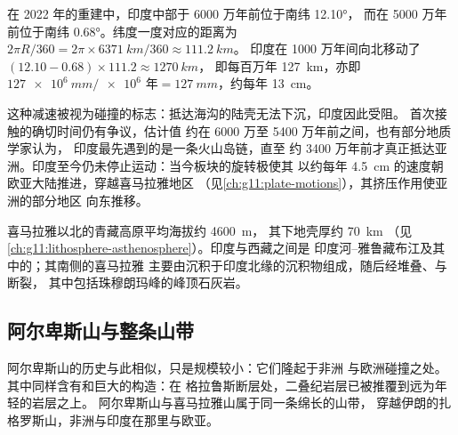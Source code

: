 \begin{example}[印度的速度]\label{ex:g12:mountain-building:india}
在 2022 年的重建中，印度中部于 6000 万年前位于南纬 \ang{12.10}，
而在 5000 万年前位于南纬 \ang{0.68}。纬度一度对应的距离为
$2\pi R/360 = 2\pi \times \qty{6371}{km}/360 \approx \qty{111.2}{km}$。
印度在 1000 万年间向北移动了 $(12.10 - 0.68) \times 111.2 \approx \qty{1270}{km}$，
即每百万年 \qty{127}{km}，亦即 $\qty{127e6}{mm} /
\num{e6}\text{ 年} = \qty{127}{mm}$，约每年 \qty{13}{cm}。
\end{example}

这种减速被视为碰撞的标志：抵达海沟的陆壳无法下沉，印度因此受阻。
首次接触的确切时间仍有争议，估计值
约在 6000 万至 5400 万年前之间，也有部分地质学家认为，
印度最先遇到的是一条火山岛链，直至
约 3400 万年前才真正抵达亚洲。印度至今仍未停止运动：当今板块的旋转极使其
以约每年 \qty{4.5}{cm} 的速度朝欧亚大陆推进，穿越喜马拉雅地区
（见\cref{ch:g11:plate-motions}），其挤压作用使亚洲的部分地区
向东推移。

喜马拉雅以北的青藏高原平均海拔约 \qty{4600}{m}，
其下地壳厚约 \qty{70}{km}
（见\cref{ch:g11:lithosphere-asthenosphere}）。印度与西藏之间是
印度河–雅鲁藏布江及其中的；其南侧的喜马拉雅
主要由沉积于印度北缘的沉积物组成，随后经堆叠、与断裂，
其中包括珠穆朗玛峰的峰顶石灰岩。

\subsection{阿尔卑斯山与整条山带}

阿尔卑斯山的历史与此相似，只是规模较小：它们隆起于非洲
与欧洲碰撞之处。其中同样含有和巨大的构造：在
格拉鲁斯断层处，二叠纪岩层已被推覆到远为年轻的岩层之上。
阿尔卑斯山与喜马拉雅山属于同一条绵长的山带，
穿越伊朗的扎格罗斯山，非洲与印度在那里与欧亚。

